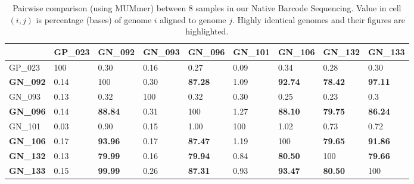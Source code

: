 \begin{table}[!hp]
\centering
\caption[Pairwise comparison between samples in Native Barcode Sequencing]{Pairwise comparison (using MUMmer) between 8 samples in our Native Barcode Sequencing. Value in cell $(i,j)$ is percentage (bases) of genome $i$ aligned to genome $j$. Highly identical genomes and their figures are highlighted.} 
\label{supp_tab:dnadiff}
\begin{tabular}{l|llllllll}
\hline
& GP\_023 & \textbf{GN\_092} & GN\_093 & \textbf{GN\_096} & GN\_101 & \textbf{GN\_106} & \textbf{GN\_132} & \textbf{GN\_133} \\ \hline
GP\_023 & 100 & 0.30 & 0.16 & 0.27 & 0.09 & 0.34 & 0.28 & 0.30 \\
\textbf{GN\_092} & 0.14 & 100  & 0.30 & \textbf{87.28} & 1.09 & \textbf{92.74} & \textbf{78.42} & \textbf{97.11} \\
GN\_093 & 0.13 & 0.32  & 100 & 0.32 & 0.30 & 0.25 & 0.23 & 0.3  \\
\textbf{GN\_096} & 0.14 & \textbf{88.84}  & 0.31 & 100 & 1.27 & \textbf{88.10}  & \textbf{79.75}  & \textbf{86.24}  \\
GN\_101 & 0.03 & 0.90 & 0.15 & 1.00 & 100 & 1.02 & 0.73  & 0.72 \\ \textbf{GN\_106} & 0.17  & \textbf{93.96} & 0.17 & \textbf{87.47} & 1.19  & 100 & \textbf{79.65} & \textbf{91.86}  \\
\textbf{GN\_132} & 0.13 & \textbf{79.99}  & 0.16  & \textbf{79.94} & 0.84 & \textbf{80.50} & 100 & \textbf{79.66} \\
\textbf{GN\_133} & 0.15 & \textbf{99.99} & 0.26 & \textbf{87.31} & 0.93    & \textbf{93.47} & \textbf{80.50} & 100 \\ \hline
\end{tabular}
\end{table}



